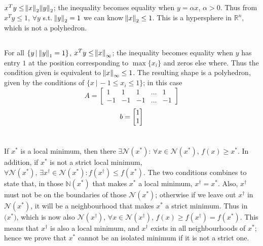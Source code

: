 \documentclass[11pt]{article}
\begin{document}
\maketitle
\section{}
\subsection{}
\subsection{}
$x^Ty\leq\norm{x}_2\norm{y}_2$; the inequality becomes equality when $y=\alpha x$, $\alpha > 0$. Thus from $x^Ty\leq 1$, $\forall y$ s.t. $\norm{y}_2=1$ we can know $\norm{x}_2\leq1$. This is a hypersphere in $\mathbb{R}^n$, which is not a polyhedron.
\subsection{}
For all $\{y\, |\,\norm{y}_1=1\}$, $x^Ty\leq\norm{x}_\infty$; the inequality becomes equality when $y$ has entry $1$ at the position corresponding to $\max \{x_i\}$ and zeros else where. Thus the condition given is equivalent to $\norm{x}_\infty\leq1$. The resulting shape is a polyhedron, given by the conditions of $\{x\, |\, -1\leq x_i\leq1\}$; in this case $$A=\begin{bmatrix} 1 & 1 & 1 &\dots&1\\-1 &-1&-1&\dots& -1 \end{bmatrix}$$ $$\\b=\begin{bmatrix}1\\1\end{bmatrix}$$

\section{}
If $x^*$ is a local minimum, then there $\exists\mathcal{N}(x^*):\,\forall x \in\mathcal{N}(x^*),\,f(x)\geq x^*$. In addition, if $x^*$ is not a strict local minimum, $\forall \mathcal{N}(x^*),\,\exists x^\dagger\in\mathcal{N}(x^*):f(x^\dagger)\leq f(x^*) $. The two conditions combines to state that, in those $\mathbb{N}(x^*)$ that makes $x^*$ a local minimum, $x^\dagger=x^*$. Also, $x^\dagger$ must not be on the boundaries of those $\mathcal{N}(x^*)$; otherwise if we leave out $x^\dagger$ in $\mathcal{N}(x^*)$, it will be a neighbourhood that makes $x^*$ a strict minimum. Thus in $\mathcal(x^*)$, which is now also $\mathcal{N}(x^\dagger)$, $\forall x\in\mathcal{N}(x^\dagger)$, $f(x) \geq f(x^\dagger)=f(x^*)$. This means that $x^\dagger$ is also a local minimum, and $x^\dagger$ exists in all neighbourhoods of $x^*$; hence we prove that $x^*$ cannot be an isolated minimum if it is not a strict one.
\end{document}
